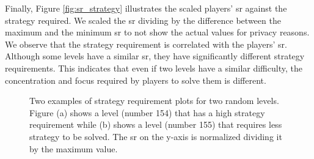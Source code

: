 Finally, Figure \ref{fig:sr_strategy} illustrates the scaled players' \acs{sr} against the strategy required. We scaled the \acs{sr} dividing by the difference between the maximum and the minimum \acs{sr} to not show the actual values for privacy reasons. We observe that the strategy requirement is correlated with the players' \acs{sr}. Although some levels have a similar \acs{sr}, they have significantly different strategy requirements. This indicates that even if two levels have a similar difficulty, the concentration and focus required by players to solve them is different.
\begin{figure}[H]
  \centering
    \caption{Two examples of strategy requirement plots for two random levels. Figure (a) shows a level (number 154) that has a high strategy requirement while (b) shows a level (number 155) that requires less strategy to be solved. The \acs{sr} on the y-axis is normalized dividing it by the maximum value.}
    \label{fig:two_levels_strategy}
\end{figure}

